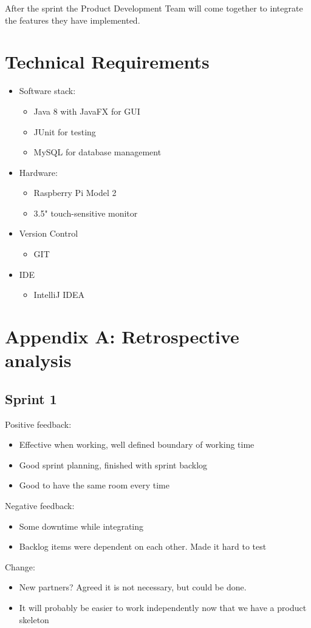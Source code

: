 \documentclass[a4paper,12pt]{article}
\begin{document}
After the sprint the Product Development Team will come together to integrate the features they have implemented.

\section{Technical Requirements}
\begin{itemize}
	\item Software stack:
	\begin{itemize}
		\item Java 8 with JavaFX for GUI
		\item JUnit for testing
		\item MySQL for database management
	\end{itemize}
	\item Hardware:
	\begin{itemize}
		\item Raspberry Pi Model 2
		\item 3.5" touch-sensitive monitor
	\end{itemize}
	\item Version Control
	\begin{itemize}
		\item GIT
	\end{itemize}
	\item IDE
	\begin{itemize}
		\item IntelliJ IDEA
	\end{itemize}
\end{itemize}

\section{Appendix A: Retrospective analysis}
\subsection{Sprint 1}
Positive feedback:
\begin{itemize}
	\item Effective when working, well defined boundary of working time
	\item Good sprint planning, finished with sprint backlog
	\item Good to have the same room every time
\end{itemize}
 Negative feedback:
 \begin{itemize}
 	\item Some downtime while integrating
 	\item Backlog items were dependent on each other. Made it hard to test
 \end{itemize}
 Change:
 \begin{itemize}
 	\item New partners? Agreed it is not necessary, but could be done.
 	\item It will probably be easier to work independently now that we have a product skeleton
 \end{itemize}
 
\end{document}
